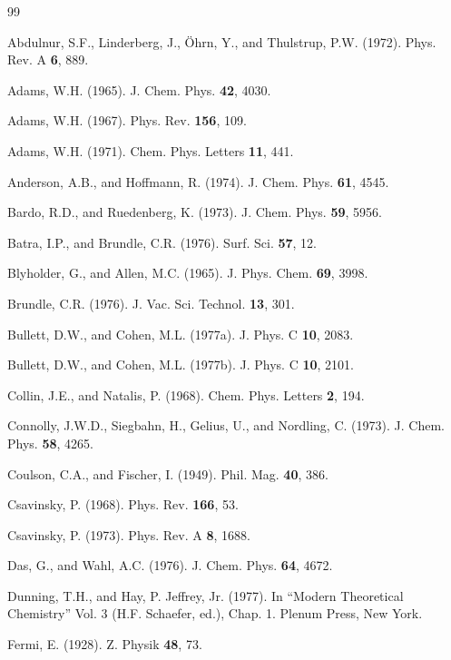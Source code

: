 \documentclass[12pt,letterpaper]{report}
\begin{document}
\begin{thebibliography}{99}

 Abdulnur, S.F., Linderberg, J., Öhrn, Y., and Thulstrup, P.W. (1972). Phys. Rev. A \textbf{6}, 889.

 Adams, W.H. (1965). J. Chem. Phys. \textbf{42}, 4030.

 Adams, W.H. (1967). Phys. Rev. \textbf{156}, 109.

 Adams, W.H. (1971). Chem. Phys. Letters \textbf{11}, 441.

 Anderson, A.B., and Hoffmann, R. (1974). J. Chem. Phys. \textbf{61}, 4545.

 Bardo, R.D., and Ruedenberg, K. (1973). J. Chem. Phys. \textbf{59}, 5956.

 Batra, I.P., and Brundle, C.R. (1976). Surf. Sci. \textbf{57}, 12.

 Blyholder, G., and Allen, M.C. (1965). J. Phys. Chem. \textbf{69}, 3998.

 Brundle, C.R. (1976). J. Vac. Sci. Technol. \textbf{13}, 301.

 Bullett, D.W., and Cohen, M.L. (1977a). J. Phys. C \textbf{10}, 2083.

 Bullett, D.W., and Cohen, M.L. (1977b). J. Phys. C \textbf{10}, 2101.

 Collin, J.E., and Natalis, P. (1968). Chem. Phys. Letters \textbf{2}, 194.

 Connolly, J.W.D., Siegbahn, H., Gelius, U., and Nordling, C. (1973). J. Chem. Phys. \textbf{58}, 4265.

 Coulson, C.A., and Fischer, I. (1949). Phil. Mag. \textbf{40}, 386.

 Csavinsky, P. (1968). Phys. Rev. \textbf{166}, 53.

 Csavinsky, P. (1973). Phys. Rev. A \textbf{8}, 1688.

 Das, G., and Wahl, A.C. (1976). J. Chem. Phys. \textbf{64}, 4672.

 Dunning, T.H., and Hay, P. Jeffrey, Jr. (1977). In ``Modern Theoretical Chemistry'' Vol. 3 (H.F. Schaefer, ed.), Chap. 1. Plenum Press, New York.

 Fermi, E. (1928). Z. Physik \textbf{48}, 73.


\end{thebibliography}
\end{document}
